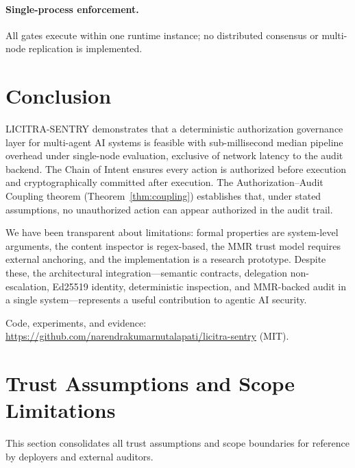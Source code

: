 \documentclass[11pt,a4paper]{article}
\begin{document}
\paragraph{Single-process enforcement.}
All gates execute within one runtime instance; no distributed consensus or multi-node
replication is implemented.


\section{Conclusion}

LICITRA-SENTRY demonstrates that a deterministic authorization governance layer for multi-agent
AI systems is feasible with sub-millisecond median pipeline overhead under single-node
evaluation, exclusive of network latency to the audit backend. The Chain of Intent ensures
every action is
authorized before execution and cryptographically committed after execution. The
Authorization--Audit Coupling theorem (Theorem~\ref{thm:coupling}) establishes that, under
stated assumptions, no unauthorized action can appear authorized in the audit trail.

We have been transparent about limitations: formal properties are system-level arguments, the
content inspector is regex-based, the MMR trust model requires external anchoring, and the
implementation is a research prototype. Despite these, the architectural integration---semantic
contracts, delegation non-escalation, Ed25519 identity, deterministic inspection, and
MMR-backed audit in a single system---represents a useful contribution to agentic AI security.

Code, experiments, and evidence:
\url{https://github.com/narendrakumarnutalapati/licitra-sentry} (MIT).


\section{Trust Assumptions and Scope Limitations}\label{sec:trustconsolidated}

This section consolidates all trust assumptions and scope boundaries for reference by deployers
and external auditors.
\end{document}
